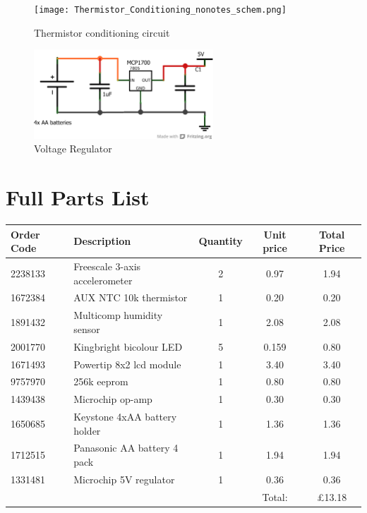 \documentclass[a4paper,11pt]{article}  %
\begin{document}
\begin{figure}[!h]
  \begin{center}
    \texttt{[image: Thermistor\_Conditioning\_nonotes\_schem.png]}
  \end{center}
  \caption{Thermistor conditioning circuit}
  \label{fig:tempcond}
\end{figure}

\begin{figure}[!h]
  \begin{center}
    \includegraphics[width=0.6\textwidth]{power_schem.png}
  \end{center}
  \caption{Voltage Regulator}
  \label{fig:voltreg}
\end{figure}

\section{Full Parts List}
\label{sec:full-parts-list}

\begin{tabular}{llccc}
  Order Code & Description & Quantity & Unit price & Total Price \\
  \hline
  2238133 & Freescale 3-axis accelerometer & 2 & 0.97 & 1.94 \\
  1672384 & AUX NTC 10k thermistor & 1 & 0.20 & 0.20 \\
  1891432 & Multicomp humidity sensor & 1 & 2.08 & 2.08 \\
  2001770 & Kingbright bicolour LED & 5 & 0.159 & 0.80 \\
  1671493 & Powertip 8x2 lcd module & 1 & 3.40 & 3.40 \\
  9757970 & 256k eeprom & 1 & 0.80 & 0.80 \\
  1439438 & Microchip op-amp & 1 & 0.30 & 0.30 \\
  1650685 & Keystone 4xAA battery holder & 1 & 1.36 & 1.36 \\
  1712515 & Panasonic AA battery 4 pack & 1 & 1.94 & 1.94 \\
  1331481 & Microchip 5V regulator & 1 & 0.36 & 0.36 \\
  \hline
  &&& Total: & \pounds 13.18
\end{tabular}




\end{document}
